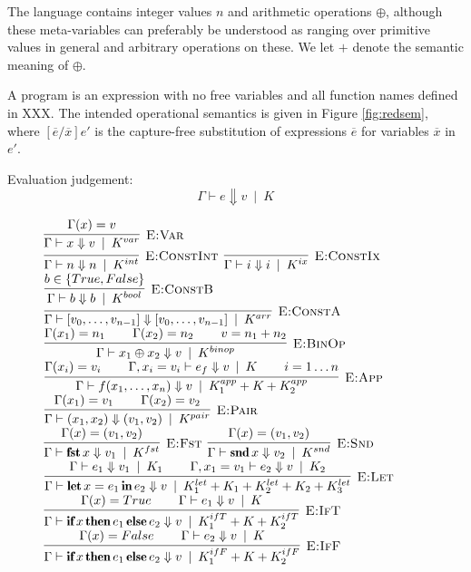 \documentclass[natbib]{sigplanconf}
\newcommand{\kw}[1]{\mbox{\fontfamily{cmr}\fontseries{b}\selectfont#1}}
\newcommand{\hinfer}[3]{\vcenter{\infer[\DT{#1}]{#2}{#3}}}
\newcommand{\ENV}{\Gamma}
\newcommand{\beval}{\Downarrow} %
\newcommand{\ent}{\vdash}
\newcommand{\cost}{\alt}
\newcommand{\nl}{\vspace{2.5ex} \\}
\newcommand{\spc}{\hspace{5ex}}
\newcommand{\DT}[1]{\mbox{\sc #1}}
\newcommand{\alt}{\;\:\vert\;\:}
\newcommand{\KBOOL}{K^{bool}}
\newcommand{\KINT}{K^{int}}
\newcommand{\KIX}{K^{ix}}
\newcommand{\KARR}{K^{arr}}
\newcommand{\KVAR}{K^{var}}
\newcommand{\KOP}{K^{binop}}
\newcommand{\KPAIR}{K^{pair}}
\newcommand{\KFST}{K^{fst}}
\newcommand{\KSND}{K^{snd}}
\newcommand{\KCONT}[1]{K^{ifT}_{#1}}
\newcommand{\KCONF}[1]{K^{ifF}_{#1}}
\newcommand{\KLET}[1]{K^{let}_{#1}}
\newcommand{\KAPP}[1]{K^{app}_{#1}}
\newcommand{\K}[1]{K_{#1}}
\newcommand{\KADD}{+} %
\newcommand{\IF}{\kw{if}\,}
\newcommand{\THEN}{\,\kw{then}\,}
\newcommand{\ELSE}{\,\kw{else}\,}
\newcommand{\LET}{\kw{let}\,}
\newcommand{\IN}{\,\kw{in}\,}
\newcommand{\FST}{\kw{fst}\,}
\newcommand{\SND}{\kw{snd}\,}
\newcommand{\TRUE}{True}
\newcommand{\FALSE}{False}
\newcommand{\ARRAY}[1]{[#1]}
\newcommand{\PAIR}[2]{(#1, #2)}
\begin{document}
The language contains integer values $n$ and arithmetic
operations $\oplus$, although these meta-variables can preferably be
understood as ranging over primitive values in general and arbitrary
operations on these. We let $+$ denote the semantic meaning of
$\oplus$.

A program is an expression with no free variables and all function
names defined in XXX.  The intended operational
semantics is given in Figure \ref{fig:redsem}, where
$[\overline{e}/\overline{x}]e'$ is the capture-free substitution of
expressions $\overline{e}$ for variables $\overline{x}$ in $e'$.

Evaluation judgement:
\begin{equation*}
\ENV \ent e \beval v \cost \K{}
\end{equation*}

\begin{figure*}
$\hinfer{E:Var}{\ENV \ent x \beval v \cost \KVAR}{\ENV(x) = v}$ \nl

$\hinfer{E:ConstInt}{\ENV \ent n \beval n \cost \KINT}{}$ \spc
$\hinfer{E:ConstIx}{\ENV \ent i \beval i \cost \KIX}{}$ \spc
$\hinfer{E:ConstB}{\ENV \ent b \beval b \cost \KBOOL}{b \in \{\TRUE, \FALSE \} }$ \nl

$\hinfer{E:ConstA}{\ENV \ent \ARRAY{v_0, \ldots, v_{n-1}} \beval \ARRAY{v_0, \ldots, v_{n-1}} \cost \KARR}{}$ \nl

$\hinfer{E:BinOp}{\ENV \ent x_1 \oplus x_2 \beval v \cost \KOP}{\ENV(x_1) = n_1 \spc \ENV(x_2) = n_2 \spc v = n_1 + n_2}$ \spc
$\hinfer{E:App}{\ENV \ent f(x_1,\ldots,x_n) \beval v \cost \KAPP{1} \KADD \K{} \KADD \KAPP{2}}{\ENV(x_i) = v_i \spc \ENV, x_i = v_i \ent e_f \beval v \cost \K{} \spc i=1\ldots n}$ \nl

$\hinfer{E:Pair}{\ENV \ent \PAIR{x_1}{x_2} \beval \PAIR{v_1}{v_2} \cost \KPAIR}{\ENV(x_1) = v_1 \spc \ENV(x_2) = v_2}$ \nl
$\hinfer{E:Fst}{\ENV \ent \FST x \beval v_1 \cost \KFST}{\ENV(x) = (v_1, v_2)}$ \spc
$\hinfer{E:Snd}{\ENV \ent \SND x \beval v_2 \cost \KSND}{\ENV(x) = (v_1, v_2)}$ \nl

$\hinfer{E:Let}{\ENV \ent \LET x = e_1 \IN e_2 \beval v \cost \KLET{1} \KADD \K{1} \KADD \KLET{2} \KADD \K{2} \KADD  \KLET{3}}{\ENV \ent e_1 \beval v_1 \cost \K{1} \spc \ENV,x_1 = v_1 \ent e_2 \beval v \cost \K{2}}$ \nl

$\hinfer{E:IfT}{\ENV \ent \IF x \THEN e_1 \ELSE e_2 \beval v \cost \KCONT{1} \KADD \K{} \KADD \KCONT{2}}{\ENV(x) = \TRUE \spc \ENV \ent e_1 \beval v \cost \K{}}$ \spc
$\hinfer{E:IfF}{\ENV \ent \IF x \THEN e_1 \ELSE e_2 \beval v \cost \KCONF{1} \KADD  \K{} \KADD  \KCONF{2}}{\ENV(x) = \FALSE \spc \ENV \ent e_2 \beval v \cost \K{}}$ \nl


\end{figure*}
\end{document}
